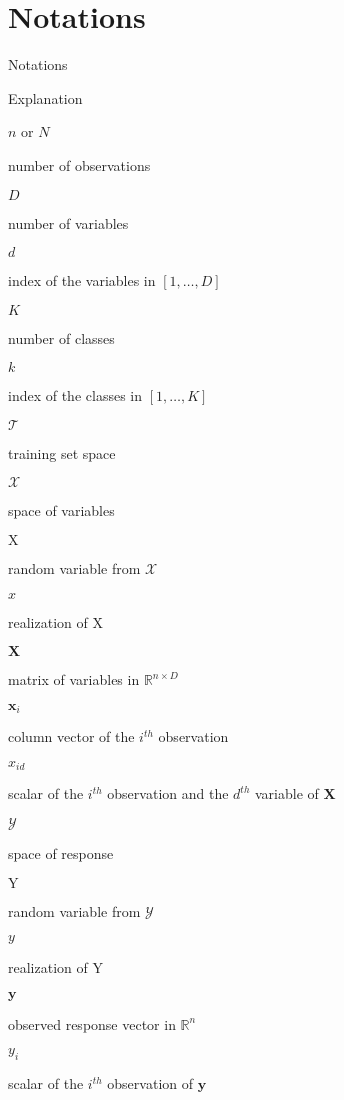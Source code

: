 \documentclass[]{book}
\begin{document}
\hypertarget{notations}{%
\chapter*{Notations}\label{notations}}

Notations

Explanation

\(n\) or \(N\)

number of observations

\(D\)

number of variables

\(d\)

index of the variables in \([1, \dots, D]\)

\(K\)

number of classes

\(k\)

index of the classes in \([1, \dots, K]\)

\(\mathcal{T}\)

training set space

\(\mathcal{X}\)

space of variables

\(\mathrm{X}\)

random variable from \(\mathcal{X}\)

\(x\)

realization of \(\mathrm{X}\)

\(\mathbf{X}\)

matrix of variables in \(\mathbb{R}^{n \times D}\)

\(\boldsymbol{x}_i\)

column vector of the \(i^{th}\) observation

\(x_{id}\)

scalar of the \(i^{th}\) observation and the \(d^{th}\) variable of \(\mathbf{X}\)

\(\mathcal{Y}\)

space of response

\(\mathrm{Y}\)

random variable from \(\mathcal{Y}\)

\(y\)

realization of \(\mathrm{Y}\)

\(\mathbf{y}\)

observed response vector in \(\mathbb{R}^n\)

\(y_i\)

scalar of the \(i^{th}\) observation of \(\mathbf{y}\)
\end{document}
